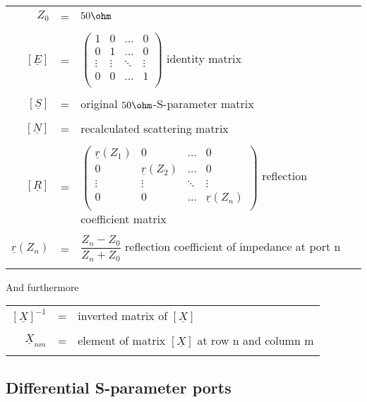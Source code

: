 \documentclass[10pt]{report}
\begin{document}
\begin{tabular}{rll}
$Z_{0}$ & = & $50\ohm$\\& &\\
$\left[\underline{E}\right]$ & = &
$\begin{pmatrix}
1 & 0 & \ldots & 0\\
0 & 1 & \ldots & 0\\
\vdots & \vdots & \ddots & \vdots\\
0 & 0 & \ldots & 1\\
\end{pmatrix}$
identity matrix\\& &\\
$\left[\underline{S}\right]$ & = & original $50\ohm$-S-parameter matrix\\& &\\
$\left[\underline{N}\right]$ & = & recalculated scattering matrix\\& &\\
$\left[\underline{R}\right]$ & = &
$\begin{pmatrix}
\underline{r}(Z_{1}) & 0 & \ldots & 0\\
0 & \underline{r}(Z_{2}) & \ldots & 0\\
\vdots & \vdots & \ddots & \vdots\\
0 & 0 & \ldots & \underline{r}(Z_{n})\\
\end{pmatrix}$
reflection coefficient matrix\\& &\\
$\underline{r}(Z_{n})$ & = &
$\dfrac{Z_{n} - Z_{0}}{Z_{n} + Z_{0}}$
reflection coefficient of impedance at port n\\& &\\
\end{tabular}

And furthermore\\

\begin{tabular}{rll}
$\left[\underline{X}\right]^{-1}$ & = & 
inverted matrix of $\left[\underline{X}\right]$\\& &\\
$\underline{X}_{nm}$ & = & 
element of matrix $\left[\underline{X}\right]$ at row n and column m\\& &\\
\end{tabular}

\subsection*{Differential S-parameter ports}
\end{document}
